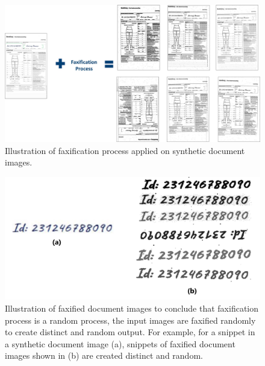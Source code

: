 \begin{figure}[H]
        \begin{center}
	    \includegraphics[scale=0.25]{images/Evaluation/FaxificationProcess.jpg}
	    \caption[Illustration of faxification process applied on synthetic document images.]{Illustration of faxification process applied on synthetic document images.}
	    \label{fig:FaxificationProcess}
	    \end{center}
\end{figure}



\begin{figure}[H]
        \begin{center}
	    \includegraphics[scale=0.15]{images/Evaluation/FaxificationProcessZoomed.jpg}
	    \caption[Illustration of faxified document images to conclude that faxification process is a random process, the input images are faxified randomly to create distinct output.]{Illustration of faxified document images to conclude that faxification process is a random process, the input images are faxified randomly to create distinct and random output. For example, for a snippet in a synthetic document image (a), snippets of faxified document images shown in (b) are created distinct and random.}
	    \label{fig:FaxificationProcessZoomed}
	    \end{center}
\end{figure}






